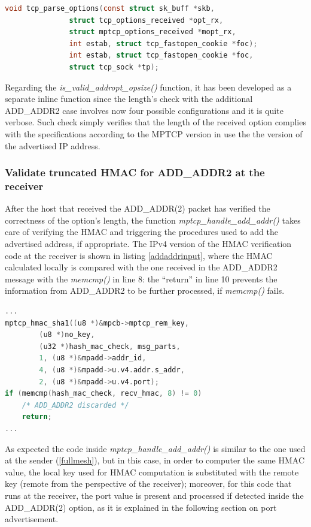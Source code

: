 \begin{lstlisting}[language=c, caption=New definition for \textit{tcp\_parse\_options}, label=tcpparse]
void tcp_parse_options(const struct sk_buff *skb,
 		       struct tcp_options_received *opt_rx,
 		       struct mptcp_options_received *mopt_rx,
		       int estab, struct tcp_fastopen_cookie *foc);
		       int estab, struct tcp_fastopen_cookie *foc,
		       struct tcp_sock *tp);
\end{lstlisting}

Regarding the \textit{is\_valid\_addropt\_opsize()} function, it has been developed as a separate inline function since the length's check with the additional ADD\_ADDR2 case involves now four possible configurations and it is quite verbose. Such check simply verifies that the length of the received option complies with the specifications according to the MPTCP version in use the the version of the advertised IP address.

\subsubsection{Validate truncated HMAC for ADD\_ADDR2 at the receiver}
After the host that received the ADD\_ADDR(2) packet has verified the correctness of the option's length, the function \textit{mptcp\_handle\_add\_addr()} takes care of verifying the HMAC and triggering the procedures used to add the advertised address, if appropriate. The IPv4 version of the HMAC verification code at the receiver is shown in listing \ref{addaddrinput}, where the HMAC calculated locally is compared with the one received in the ADD\_ADDR2 message with the \textit{memcmp()} in line 8: the ``return'' in line 10 prevents the information from ADD\_ADDR2 to be further processed, if \textit{memcmp()} fails.

\begin{lstlisting}[language=c, caption=New ADD\_ADDR HMAC calculation (incoming IPv4 packet), label=addaddrinput]
...
mptcp_hmac_sha1((u8 *)&mpcb->mptcp_rem_key,
		(u8 *)no_key,
		(u32 *)hash_mac_check, msg_parts,
		1, (u8 *)&mpadd->addr_id,
		4, (u8 *)&mpadd->u.v4.addr.s_addr,
		2, (u8 *)&mpadd->u.v4.port);
if (memcmp(hash_mac_check, recv_hmac, 8) != 0)
	/* ADD_ADDR2 discarded */
	return;
...
\end{lstlisting}

As expected the code inside \textit{mptcp\_handle\_add\_addr()} is similar to the one used at the sender (\ref{fullmesh}), but in this case, in order to computer the same HMAC value, the local key used for HMAC computation is substituted with the remote key (remote from the perspective of the receiver); moreover, for this code that runs at the receiver, the port value is present and processed if detected inside the ADD\_ADDR(2) option, as it is explained in the following section on port advertisement.

